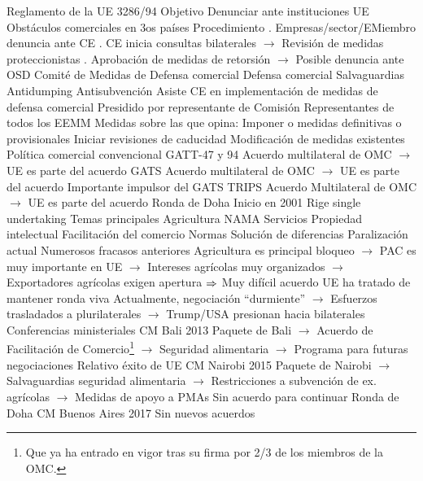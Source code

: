 \documentclass{nuevotema}
\begin{document}
\begin{esquemal}
				\4 Reglamento de la UE 3286/94
				\4 Objetivo
				\4[] Denunciar ante instituciones UE
				\4[] Obstáculos comerciales en 3os países
				\4 Procedimiento
				. Empresas/sector/EMiembro denuncia ante CE
				. CE inicia consultas bilaterales
				\4[] $\to$ Revisión de medidas proteccionistas
				. Aprobación de medidas de retorsión
				\4[] $\to$ Posible denuncia ante OSD
			\3 Comité de Medidas de Defensa comercial
				\4 Defensa comercial
				\4[] Salvaguardias
				\4[] Antidumping
				\4[] Antisubvención
				\4 Asiste CE en implementación de medidas de defensa comercial
				\4 Presidido por representante de Comisión
				\4 Representantes de todos los EEMM
				\4 Medidas sobre las que opina:
				\4[] Imponer o medidas definitivas o provisionales
				\4[] Iniciar revisiones de caducidad
				\4[] Modificación de medidas existentes
		\2 Política comercial convencional
			\3 GATT-47 y 94
				\4 Acuerdo multilateral de OMC
				\4[] $\to$ UE es parte del acuerdo
			\3 GATS
				\4 Acuerdo multilateral de OMC
				\4[] $\to$ UE es parte del acuerdo
				\4 Importante impulsor del GATS
			\3 TRIPS
				\4 Acuerdo Multilateral de OMC
				\4[] $\to$ UE es parte del acuerdo
			\3 Ronda de Doha
				\4 Inicio en 2001
				\4 Rige single undertaking
				\4 Temas principales
				\4[] Agricultura
				\4[] NAMA
				\4[] Servicios
				\4[] Propiedad intelectual
				\4[] Facilitación del comercio
				\4[] Normas
				\4[] Solución de diferencias
				\4 Paralización actual
				\4[] Numerosos fracasos anteriores
				\4[] Agricultura es principal bloqueo
				\4[] $\to$ PAC es muy importante en UE
				\4[] $\to$ Intereses agrícolas muy organizados
				\4[] $\to$ Exportadores agrícolas exigen apertura
				\4[] $\Rightarrow$ Muy difícil acuerdo
				\4[] UE ha tratado de mantener ronda viva
				\4[] Actualmente, negociación ``durmiente''
				\4[] $\to$ Esfuerzos trasladados a plurilaterales
				\4[] $\to$ Trump/USA presionan hacia bilaterales
			\3 Conferencias ministeriales
				\4 CM Bali 2013
				\4[] Paquete de Bali
				\4[] $\to$ Acuerdo de Facilitación de Comercio\footnote{Que ya ha entrado en vigor tras su firma por 2/3 de los miembros de la OMC.}
				\4[] $\to$ Seguridad alimentaria
				\4[] $\to$ Programa para futuras negociaciones
				\4[] Relativo éxito de UE
				\4 CM Nairobi 2015
				\4[] Paquete de Nairobi
				\4[] $\to$ Salvaguardias seguridad alimentaria
				\4[] $\to$ Restricciones a subvención de ex. agrícolas
				\4[] $\to$ Medidas de apoyo a PMAs
				\4[] Sin acuerdo para continuar Ronda de Doha
				\4 CM Buenos Aires 2017
				\4[] Sin nuevos acuerdos

\end{esquemal}
\end{document}
